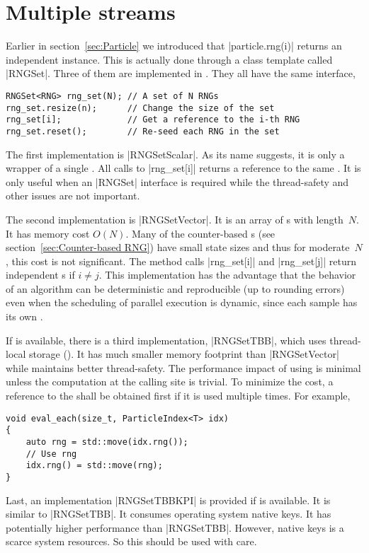 \section{Multiple \texorpdfstring{\rng}{RNG} streams}
\label{sec:Multiple RNG streams}

Earlier in section~\ref{sec:Particle} we introduced that |particle.rng(i)|
returns an independent \rng instance. This is actually done through a class
template called |RNGSet|. Three of them are implemented in \mckl. They all have
the same interface,
\begin{verbatim}
RNGSet<RNG> rng_set(N); // A set of N RNGs
rng_set.resize(n);      // Change the size of the set
rng_set[i];             // Get a reference to the i-th RNG
rng_set.reset();        // Re-seed each RNG in the set
\end{verbatim}
The first implementation is |RNGSetScalar|. As its name suggests, it is only a
wrapper of a single \rng. All calls to |rng_set[i]| returns a reference to the
same \rng. It is only useful when an |RNGSet| interface is required while the
thread-safety and other issues are not important.

The second implementation is |RNGSetVector|. It is an array of \rng{}s with
length~$N$. It has memory cost $O(N)$. Many of the counter-based \rng{}s (see
section~\ref{sec:Counter-based RNG}) have small state sizes and thus for
moderate~$N$, this cost is not significant. The method calls |rng_set[i]| and
|rng_set[j]| return independent \rng{}s if $i \ne j$. This implementation has
the advantage that the behavior of an algorithm can be deterministic and
reproducible (up to rounding errors) even when the scheduling of parallel
execution is dynamic, since each sample has its own \rng.

If \tbb is available, there is a third implementation, |RNGSetTBB|, which
uses thread-local storage (\tls). It has much smaller memory footprint than
|RNGSetVector| while maintains better thread-safety. The performance impact of
using \tls is minimal unless the computation at the calling site is trivial. To
minimize the \tls cost, a reference to the \rng shall be obtained first if it
is used multiple times. For example,
\begin{verbatim}
void eval_each(size_t, ParticleIndex<T> idx)
{
    auto rng = std::move(idx.rng());
    // Use rng
    idx.rng() = std::move(rng);
}
\end{verbatim}

Last, an implementation |RNGSetTBBKPI| is provided if \tbb is available. It is
similar to |RNGSetTBB|. It consumes operating system native \tls keys. It has
potentially higher performance than |RNGSetTBB|. However, native \tls keys is a
scarce system resources. So this should be used with care.

